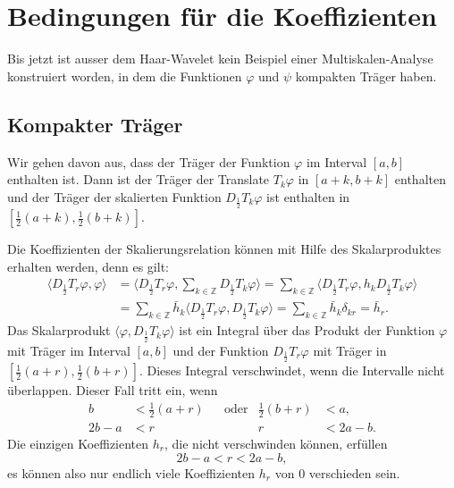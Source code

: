 %
%
%
\section{Bedingungen für die Koeffizienten\label{section:bedingungen}}
Bis jetzt ist ausser dem Haar-Wavelet kein Beispiel einer
Multiskalen-Analyse konstruiert worden, in dem die Funktionen 
$\varphi$ und $\psi$ kompakten Träger haben.

\subsection{Kompakter Träger}
Wir gehen davon aus, dass der Träger der Funktion $\varphi$ im Interval
$[a,b]$ enthalten ist.
Dann ist der Träger der Translate $T_k\varphi$ in $[a+k,b+k]$ enthalten
und der Träger der skalierten Funktion $D_{\frac12}T_k\varphi$ ist
enthalten in $[\frac12(a+k),\frac12(b+k)]$.

Die Koeffizienten der Skalierungsrelation können mit Hilfe des
Skalarproduktes erhalten werden, denn es gilt:
\begin{align*}
\langle D_{\frac12}T_r\varphi, \varphi\rangle
&=
\biggl\langle
D_{\frac12}T_r\varphi, \sum_{k\in\mathbb Z} D_{\frac12}T_k\varphi
\biggr\rangle
=
\sum_{k\in\mathbb Z}
\langle
D_{\frac12}T_r\varphi,
h_kD_{\frac12}T_k\varphi
\rangle
\\
&=
\sum_{k\in\mathbb Z}
\bar{h}_k
\langle
D_{\frac12}T_r\varphi,
D_{\frac12}T_k\varphi
\rangle
=
\sum_{k\in\mathbb Z}
\bar{h}_k
\delta_{kr}
=
\bar{h}_r.
\end{align*}
Das Skalarprodukt
$\langle \varphi, D_{\frac12}T_k\varphi\rangle$
ist ein Integral über das Produkt der Funktion $\varphi$ mit Träger im Interval
$[a,b]$ und der Funktion $D_{\frac12}T_r\varphi$  mit Träger in
$[\frac12(a+r),\frac12(b+r)]$.
Dieses Integral verschwindet, wenn die Intervalle nicht überlappen.
Dieser Fall tritt ein, wenn
\[
\begin{aligned}
b&<\frac12(a+r) &&\text{oder}& \frac12(b+r) &< a,
\\
2b-a&<r         &&           &            r &< 2a-b.
\end{aligned}
\]
Die einzigen Koeffizienten $h_r$, die nicht verschwinden können, erfüllen
\[
2b-a < r < 2a-b,
\]
es können also nur endlich viele Koeffizienten $h_r$ von $0$ verschieden
sein.

